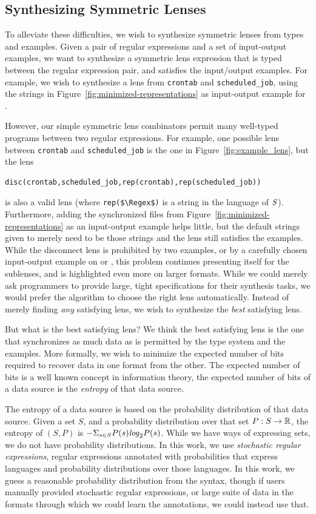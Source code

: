 \documentclass[acmsmall,screen,anonymous]{acmart}
\begin{document}
\subsection{Synthesizing Symmetric Lenses}
To alleviate these difficulties, we wish to synthesize symmetric lenses from
types and examples. Given a pair of regular expressions and a set of
input-output examples, we want to synthesize a symmetric lens expression that is
typed between the regular expression pair, and satisfies the input/output
examples. For example, we wish to synthesize a lens from \lstinline{crontab} and
\lstinline{scheduled_job}, using the strings in
Figure~\ref{fig:minimized-representations} as input-output example for \CreateR.

However, our simple symmetric lens combinators permit many well-typed programs
between two regular expressions. For example, one possible lens between
\lstinline{crontab} and \lstinline{scheduled_job} is the one in
Figure~\ref{fig:example_lens}, but the lens
%
\begin{lstlisting}
disc(crontab,scheduled_job,rep(crontab),rep(scheduled_job))
\end{lstlisting}
%
is also a valid lens (where \lstinline{rep($\Regex$)} is a string in the
language of $\mathit{S}$). Furthermore, adding the synchronized files from
Figure~\ref{fig:minimized-representations} as an input-output example helps
little, but the default strings given to \Disconnect merely need to be those
strings and the lens still satisfies the examples. While the disconnect lens is
prohibited by two examples, or by a carefully chosen input-output example on
\PutR or \PutL, this problem continues presenting itself for the sublenses, and
is highlighted even more on larger formats. While we could merely ask
programmers to provide large, tight specifications for their synthesis tasks, we
would prefer the algorithm to choose the right lens automatically. Instead of
merely finding \emph{any} satisfying lens, we wish to synthesize the \emph{best}
satisfying lens.

But what is the best satisfying lens?  We think the best satisfying lens is the
one that synchronizes as much data as is permitted by the type system and the
examples.  More formally, we wish to minimize the expected number of bits
required to recover data in one format from the other.  The expected number of
bits is a well known concept in information theory, the expected number of bits
of a data source is the \emph{entropy} of that data source.

The entropy of a data source is based on the probability distribution of that
data source. Given a set $S$, and a probability distribution over that set $P
: S \rightarrow \mathbb{R}$, the entropy of $(S,P)$ is $-\Sigma_{s\in
  S}P(s)\mathit{log}_2P(s)$. While we have ways of expressing sets, we do not have
probability distributions. In this work, we use \emph{stochastic regular
  expressions}, regular expressions annotated with probabilities that express
languages and probability distributions over those languages. In this work, we
guess a reasonable probability distribution from the syntax, though if users
manually provided stochastic regular expressions, or large suite of data in the
formats through which we could learn the annotations, we could instead use that.
\end{document}
